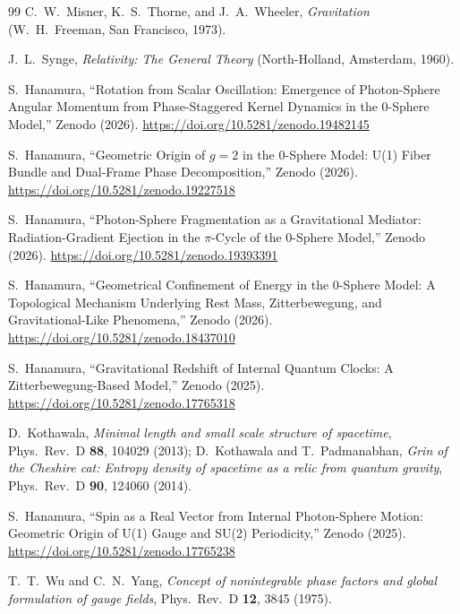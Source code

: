 \documentclass[%
 reprint, amsmath,amssymb, aps, prb, ]{revtex4-2}
\numberwithin{equation}{section}
\begin{document}
\begin{thebibliography}{99}
 C.~W.~Misner, K.~S.~Thorne, and J.~A.~Wheeler, \textit{Gravitation} (W.~H.~Freeman, San Francisco, 1973).

 J.~L.~Synge, \textit{Relativity: The General Theory} (North-Holland, Amsterdam, 1960).

S.~Hanamura,
``Rotation from Scalar Oscillation: Emergence of Photon-Sphere Angular Momentum from Phase-Staggered Kernel Dynamics in the 0-Sphere Model,''
Zenodo (2026).
\href{https://doi.org/10.5281/zenodo.19482145}{https://doi.org/10.5281/zenodo.19482145}

S.~Hanamura,
``Geometric Origin of $g = 2$ in the 0-Sphere Model: U(1) Fiber Bundle and Dual-Frame Phase Decomposition,''
Zenodo (2026).
\href{https://doi.org/10.5281/zenodo.19227518}{https://doi.org/10.5281/zenodo.19227518}

S.~Hanamura,
``Photon-Sphere Fragmentation as a Gravitational Mediator: Radiation-Gradient Ejection in the $\pi$-Cycle of the 0-Sphere Model,''
Zenodo (2026).
\href{https://doi.org/10.5281/zenodo.19393391}{https://doi.org/10.5281/zenodo.19393391}

S.~Hanamura,
``Geometrical Confinement of Energy in the 0-Sphere Model: A Topological Mechanism Underlying Rest Mass, Zitterbewegung, and Gravitational-Like Phenomena,''
Zenodo (2026).
\href{https://doi.org/10.5281/zenodo.18437010}{https://doi.org/10.5281/zenodo.18437010}

S.~Hanamura,
``Gravitational Redshift of Internal Quantum Clocks: A Zitterbewegung-Based Model,''
Zenodo (2025).
\href{https://doi.org/10.5281/zenodo.17765318}{https://doi.org/10.5281/zenodo.17765318}

 D.~Kothawala, \textit{Minimal length and small scale structure of spacetime}, Phys.\ Rev.\ D \textbf{88}, 104029 (2013); D.~Kothawala and T.~Padmanabhan, \textit{Grin of the Cheshire cat: Entropy density of spacetime as a relic from quantum gravity}, Phys.\ Rev.\ D \textbf{90}, 124060 (2014).

S.~Hanamura,
``Spin as a Real Vector from Internal Photon-Sphere Motion: Geometric Origin of U(1) Gauge and SU(2) Periodicity,''
Zenodo (2025).
\href{https://doi.org/10.5281/zenodo.17765238}{https://doi.org/10.5281/zenodo.17765238}

 T.~T.~Wu and C.~N.~Yang, \textit{Concept of nonintegrable phase factors and global formulation of gauge fields}, Phys.\ Rev.\ D \textbf{12}, 3845 (1975).


\end{thebibliography}
\end{document}
